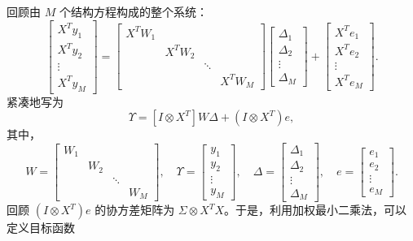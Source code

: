 回顾由 $M$ 个结构方程构成的整个系统：
\begin{equation}
 \begin{bmatrix}X^{T}y_1\\X^{T}y_2\\\vdots\\X^{T}y_M\end{bmatrix}
 =
 \begin{bmatrix}
  X^{T}W_1&&&\\
  &X^{T}W_2&&\\
  &&\ddots&\\
  &&&X^{T}W_M
 \end{bmatrix}
 \begin{bmatrix}\Delta_1\\\Delta_2\\\vdots\\\Delta_M\end{bmatrix}
 +\begin{bmatrix}X^{T}e_1\\X^{T}e_2\\\vdots\\X^{T}e_M\end{bmatrix}.
 \tag{1.99}
\end{equation}
紧凑地写为
\begin{equation}
 [I\otimes X^{T}]\Upsilon=[I\otimes X^{T}]W\Delta+(I\otimes X^{T})e,
 \tag{1.100}
\end{equation}
其中，
\[
 W=
 \begin{bmatrix}W_1&&&\\&W_2&&\\&&\ddots&\\&&&W_M\end{bmatrix},
 \quad
 \Upsilon=\begin{bmatrix}y_1\\y_2\\\vdots\\y_M\end{bmatrix},
 \quad
 \Delta=\begin{bmatrix}\Delta_1\\\Delta_2\\\vdots\\\Delta_M\end{bmatrix},
 \quad
 e=\begin{bmatrix}e_1\\e_2\\\vdots\\e_M\end{bmatrix}.
\]
回顾 $(I\otimes X^{T})e$ 的协方差矩阵为 $\Sigma\otimes X^{T}X$。于是，利用加权最小二乘法，可以定义目标函数
